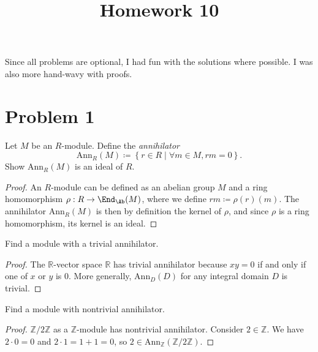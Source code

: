 \documentclass[11pt, letterpaper]{article}
\title{Homework 10}
\begin{document}
\makeproblem
\begin{remark}
	Since all problems are optional, I had fun with the solutions where possible. I was also more hand-wavy with proofs.
\end{remark}

\section{Problem 1}

\begin{problem}
	Let $M$ be an $R$-module. Define the \emph{annihilator}
	\[
		\mathrm{Ann} _R(M)\coloneqq \left\{ r\in R\mid \forall m\in M,r m=0 \right\} 
	.\]
	Show $\mathrm{Ann} _R(M)$ is an ideal of $R$.
\end{problem}
\begin{proof}
	An $R$-module can be defined as an abelian group $M$ and a ring homomorphism $\rho :R \to \End_{\Ab }(M) $, where we define $r m\coloneqq \rho (r)(m)$. The annihilator $\mathrm{Ann} _R(M)$ is then by definition the kernel of $\rho $, and since $\rho $ is a ring homomorphism, its kernel is an ideal.
\end{proof}
\begin{problem}
	Find a module with a trivial annihilator.
\end{problem}
\begin{proof}
	The $\mathbb{R} $-vector space $\mathbb{R} $ has trivial annihilator because $xy = 0$ if and only if one of $x$ or $y$ is 0. More generally, $\mathrm{Ann} _D(D)$ for any integral domain $D$ is trivial.
\end{proof}
\begin{problem}
	Find a module with nontrivial annihilator.
\end{problem}
\begin{proof}
	$\mathbb{Z} /2\mathbb{Z} $ as a $\mathbb{Z} $-module has nontrivial annihilator. Consider $2\in\mathbb{Z} $. We have $2\cdot 0=0$ and $2\cdot 1=1+1=0$, so $2\in \mathrm{Ann} _\mathbb{Z} (\mathbb{Z} /2\mathbb{Z} )$.
\end{proof}
\end{document}
